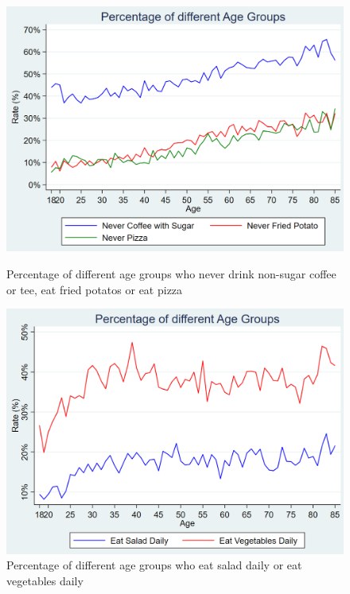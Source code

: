 \documentclass{article}
\begin{document}
\begin{figure}[!h]   
	\begin{minipage}[b]{0.45\linewidth}
		\centering
		\includegraphics[width=\textwidth]{../Image/Graph01.png}
		\caption{Percentage of different age groups who never drink non-sugar coffee or tee, eat fried potatos or eat pizza}
		\label{fig:G1}
	\end{minipage}
	\hfill
	\begin{minipage}[b]{0.45\linewidth}
		\centering
		\includegraphics[width=\textwidth]{../Image/Graph02.png}
		\caption{Percentage of different age groups who eat salad daily or eat vegetables daily}
		\label{fig:G2}
	\end{minipage}
\end{figure}
\end{document}
